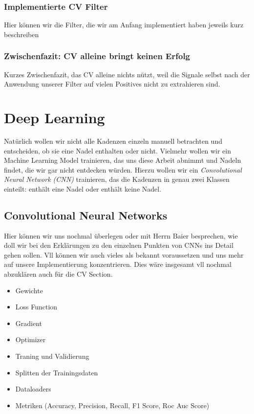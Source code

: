 \documentclass[11pt, a4paper]{article}
\begin{document}
\subsubsection{Implementierte CV Filter}
Hier können wir die Filter, die wir am Anfang implementiert haben jeweils kurz beschreiben

\subsubsection{Zwischenfazit: CV alleine bringt keinen Erfolg}
Kurzes Zwischenfazit, das CV alleine nichts nützt, weil die Signale selbst nach der Anwendung unserer Filter auf vielen Positives nicht zu extrahieren sind.

\section{Deep Learning}
Natürlich wollen wir nicht alle Kadenzen einzeln manuell betrachten und entscheiden, ob sie eine Nadel enthalten oder nicht. Vielmehr wollen wir ein Machine Learning Model trainieren, das uns diese Arbeit abnimmt und Nadeln findet, die wir gar nicht entdecken würden. Hierzu wollen wir ein \emph{Convolutional Neural Network (CNN)} trainieren, das die Kadenzen in genau zwei Klassen einteilt: enthält eine Nadel oder enthält keine Nadel.

\subsection{Convolutional Neural Networks}
Hier können wir uns nochmal überlegen oder mit Herrn Baier besprechen, wie doll wir bei den Erklärungen zu den einzelnen Punkten von CNNs ins Detail gehen sollen. Vll können wir auch vieles als bekannt voraussetzen und uns mehr auf unsere Implementierung konzentrieren. Dies wäre insgesamt vll nochmal abzuklären auch für die CV Section.

\begin{itemize}
	\item Gewichte
	\item Loss Function
	\item Gradient
	\item Optimizer
	\item Traning und Validierung
	\item Splitten der Trainingsdaten
	\item Dataloaders
	\item Metriken (Accuracy, Precision, Recall, F1 Score, Roc Auc Score)
\end{itemize}
\end{document}
